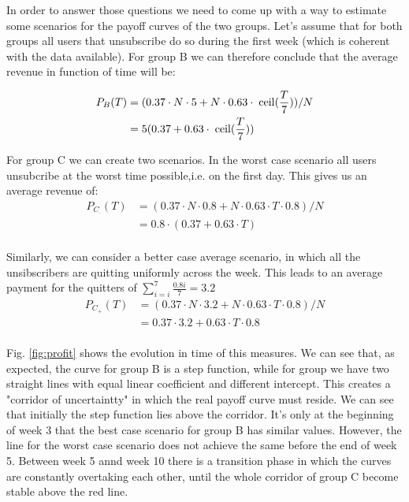 \documentclass[paper=a4, fontsize=10pt]{report}
\begin{document}
In order to answer those questions we need to come up with a way to estimate some scenarios for the payoff curves of the two groups.
Let's assume that for both groups all users that unsubscribe do so during the first week (which is coherent with the data available). 
For group B we can therefore conclude that the average revenue in function of time will be:


\begin{equation}
\begin{split}
 P_{B}(T) & = (0.37 \cdot N \cdot 5 + N \cdot 0.63  \cdot  \hspace{1mm}\mathrm{ceil} (\frac{T}{7}) )/N \\
 & = 5(0.37+0.63  \cdot  \hspace{1mm}\mathrm{ceil} (\frac{T}{7})) \\
 \end{split}
\end{equation}

For group C we can create two scenarios. In the worst case scenario all users unsubcribe at the worst time possible,i.e. on the first day. This gives us an average revenue of:
\begin{equation}
\begin{split}
 P_{C_{\!^{\_}}}(T) & = (0.37 \cdot N \cdot 0.8 + N \cdot 0.63 \cdot T \cdot 0.8)/N \\
 & = 0.8 \cdot (0.37 + 0.63 \cdot T) \\
 \end{split}
\end{equation}

Similarly, we can consider a better case average scenario, in which all the unsibscribers are quitting uniformly across the week.
This leads to an average payment for the quitters of $\sum_{i=i}^{7} \frac{0.8i}{7} = 3.2$
\begin{equation}
\begin{split}
 P_{C_{+}}(T) & = (0.37 \cdot N \cdot 3.2 + N \cdot 0.63 \cdot T \cdot 0.8)/N \\
 & = 0.37 \cdot 3.2 + 0.63 \cdot T \cdot 0.8 \\
 \end{split}
\end{equation}

Fig. \ref{fig:profit} shows the evolution in time of this measures. We can see that, as expected, the curve for 
group B is a step function, while for group we have two straight lines with equal linear coefficient and different intercept. This
creates a "corridor of uncertaintty" in which the real payoff curve must reside. We can see that initially
the step function lies above the corridor. It's only at the beginning of week 3 that the best case scenario 
for group B has similar values. However, the line for the worst case scenario does not achieve the same before the end
of week 5. Between week 5 annd week 10 there is a transition phase in which the curves are constantly overtaking each other, until
the whole corridor of group C become stable above the red line.
\end{document}
